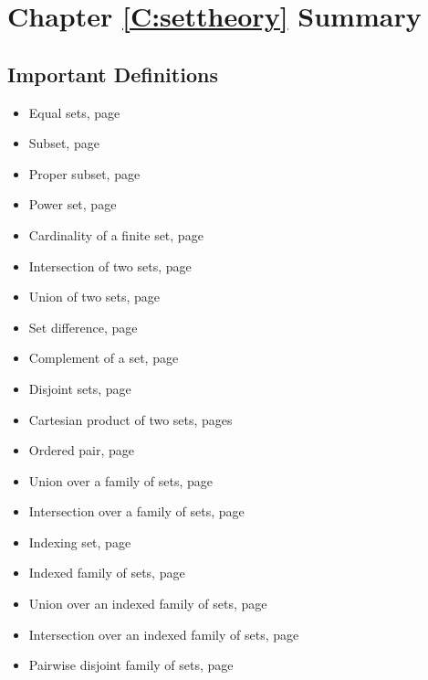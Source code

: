 \section{Chapter \ref{C:settheory} Summary} \label{Su:settheory}

\subsection*{Important Definitions}
\begin{multicols}{2}
\begin{itemize}
\item Equal sets, page~\pageref*{sym:setequal12}
\item Subset, page~\pageref*{sym:subset2}
\item Proper subset, page~\pageref*{sym:propersub}
\item Power set, page~\pageref*{D:powerset}
\item Cardinality of a finite set, page~\pageref*{D:cardinality}
\item Intersection of two sets, page~\pageref*{intersection}
\item Union of two sets, page~\pageref*{intersection}
\item Set difference, page~\pageref*{setdiff}
\item Complement of a set, page~\pageref*{setdiff}
\item Disjoint sets, page~\pageref*{D:disjointsets}
\item Cartesian product of two sets, pages~\pageref*{cartesianproduct}%
\item Ordered pair, page~\pageref*{orderedpair}
\item Union over a family of sets, page~\pageref*{D:familyoper}
\item Intersection over a family of sets, page~\pageref*{D:familyoper}
\item Indexing set, page~\pageref*{D:indexfamily}
\item Indexed family of sets, page~\pageref*{D:indexfamily}
\item Union over an indexed family of sets, page~\pageref*{D:indexoper}
\item Intersection over an indexed family of sets, page~\pageref*{D:indexoper}
\item Pairwise disjoint family of sets, page~\pageref*{D:disjointfamily}
\end{itemize}
\end{multicols}
\hbreak



